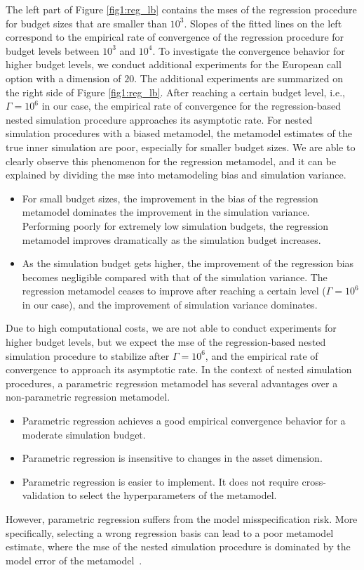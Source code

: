 The left part of Figure \ref{fig1:reg_lb} contains the \gls{mse}s of the regression procedure for budget sizes that are smaller than $10^3$. 
Slopes of the fitted lines on the left correspond to the empirical rate of convergence of the regression procedure for budget levels between $10^3$ and $10^4$.
To investigate the convergence behavior for higher budget levels, we conduct additional experiments for the European call option with a dimension of $20$. 
The additional experiments are summarized on the right side of Figure \ref{fig1:reg_lb}.
After reaching a certain budget level, i.e., $\Gamma = 10^6$ in our case, the empirical rate of convergence for the regression-based nested simulation procedure approaches its asymptotic rate. 
For nested simulation procedures with a biased metamodel, the metamodel estimates of the true inner simulation are poor, especially for smaller budget sizes. 
We are able to clearly observe this phenomenon for the regression metamodel, and it can be explained by dividing the \gls{mse} into metamodeling bias and simulation variance.
\begin{itemize}
    \item For small budget sizes, the improvement in the bias of the regression metamodel dominates the improvement in the simulation variance. 
    Performing poorly for extremely low simulation budgets, the regression metamodel improves dramatically as the simulation budget increases.
    \item As the simulation budget gets higher, the improvement of the regression bias becomes negligible compared with that of the simulation variance. 
    The regression metamodel ceases to improve after reaching a certain level ($\Gamma = 10^6$ in our case), and the improvement of simulation variance dominates.
\end{itemize}
Due to high computational costs, we are not able to conduct experiments for higher budget levels, but we expect the \gls{mse} of the regression-based nested simulation procedure to stabilize after $\Gamma = 10^6$, and the empirical rate of convergence to approach its asymptotic rate.
In the context of nested simulation procedures, a parametric regression metamodel has several advantages over a non-parametric regression metamodel.
\begin{itemize}
    \item Parametric regression achieves a good empirical convergence behavior for a moderate simulation budget.
    \item Parametric regression is insensitive to changes in the asset dimension.
    \item Parametric regression is easier to implement.
    It does not require cross-validation to select the hyperparameters of the metamodel.
\end{itemize}
However, parametric regression suffers from the model misspecification risk.
More specifically, selecting a wrong regression basis can lead to a poor metamodel estimate, where the \gls{mse} of the nested simulation procedure is dominated by the model error of the metamodel~\citep{broadie2015risk}.

